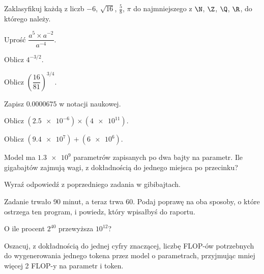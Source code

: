 \begin{testexercises}
\item Zaklasyfikuj każdą z liczb $-6$, $\sqrt{16}$, $\tfrac{5}{8}$, $\pi$ do
  najmniejszego z $\N$, $\Z$, $\Q$, $\R$, do którego należy.
\item Uprość $\dfrac{a^{5} \times a^{-2}}{a^{-4}}$.
\item Oblicz $4^{-3/2}$.
\item Oblicz $\left(\dfrac{16}{81}\right)^{3/4}$.
\item Zapisz $\num{0.0000675}$ w notacji naukowej.
\item Oblicz $(\num{2.5e-6}) \times (\num{4e11})$.
\item Oblicz $(\num{9.4e7}) + (\num{6e6})$.
\item Model ma $\num{1.3e9}$ parametrów zapisanych po dwa bajty na parametr.
  Ile gigabajtów zajmują wagi, z dokładnością do jednego miejsca po przecinku?
\item Wyraź odpowiedź z poprzedniego zadania w gibibajtach.
\item Zadanie trwało 90 minut, a teraz trwa 60. Podaj poprawę na oba sposoby, o
  które ostrzega ten program, i powiedz, który wpisałbyś do raportu.
\item O ile procent $2^{40}$ przewyższa $10^{12}$?
\item Oszacuj, z dokładnością do jednej cyfry znaczącej, liczbę FLOP-ów
  potrzebnych do wygenerowania jednego tokena przez model o 
  parametrach, przyjmując mniej więcej 2 FLOP-y na parametr i token.
\end{testexercises}

